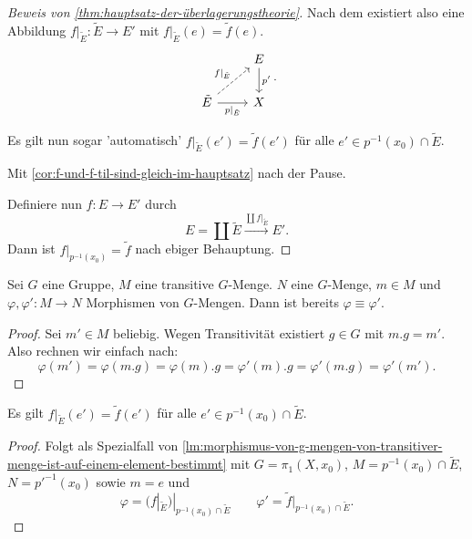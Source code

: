 \begin{proof}[Beweis von \autoref{thm:hauptsatz-der-überlagerungstheorie}]
    Nach dem  existiert also eine Abbildung $f|_{\tilde{E}}\colon \tilde{E} \to  E'$ mit $f|_{\tilde{E}}(e) = \tilde{f}(e)$.
    \[
    \begin{tikzcd}
        & E \ar{d}{p'} \\
        \tilde{E} \ar[dashed]{ur}{f|_{\tilde{E}}} \ar[swap]{r}{p|_{\tilde{E}}} & X
    \end{tikzcd}
    .\]
    \begin{claim}
        Es gilt nun sogar 'automatisch' $f|_{\tilde{E}}(e') = \tilde{f}(e')$ für alle $e' \in p^{-1} (x_0) \cap  \tilde{E}$.
    \end{claim}
    \begin{subproof}
        Mit \autoref{cor:f-und-f-til-sind-gleich-im-hauptsatz}  nach der Pause.
    \end{subproof}
    Definiere nun $f\colon  E \to  E'$ durch
    \[
    E = \coprod \tilde{E} \stackrel{\coprod f|_{\tilde{E}}}{\longrightarrow} E'
    .\] 
    Dann ist $f|_{p^{-1} (x_0)} = \tilde{f}$ nach ebiger Behauptung.
\end{proof}


\begin{lemma}\label{lm:morphismus-von-g-mengen-von-transitiver-menge-ist-auf-einem-element-bestimmt}
    Sei $G$ eine Gruppe,  $M$ eine transitive  $G$-Menge.  $N$ eine  $G$-Menge,  $m\in M$ und $\varphi ,\varphi '\colon M \to  N$ Morphismen von $G$-Mengen. Dann ist bereits $\varphi  \equiv  \varphi '$.
\end{lemma}
\begin{proof}
    Sei $m' \in M$ beliebig. Wegen Transitivität existiert $g\in G$ mit $m.g = m'$. Also rechnen wir einfach nach:
     \[
         \varphi (m') = \varphi (m.g) = \varphi (m).g = \varphi' (m).g = \varphi' (m.g) = \varphi '(m')
    .\] 
\end{proof}

\begin{corollary}\label{cor:f-und-f-til-sind-gleich-im-hauptsatz}
    Es gilt $f|_{\tilde{E}}(e') = \tilde{f}(e')$ für alle $e'\in p^{-1} (x_0) \cap  \tilde{E}$.
\end{corollary}

\begin{proof}
    Folgt als Spezialfall von \autoref{lm:morphismus-von-g-mengen-von-transitiver-menge-ist-auf-einem-element-bestimmt} mit $G = \pi_1(X,x_0)$, $M = p^{-1} (x_0) \cap \tilde{E}$, $N = p'^{-1}(x_0)$ sowie $m = e$ und 
     \[
         \varphi  = (f|_{\tilde{E}})|_{p^{-1} (x_0)\cap \tilde{E}} \qquad \varphi ' = \tilde{f}|_{p^{-1} (x_0) \cap \tilde{E}}
    .\] 
\end{proof}

